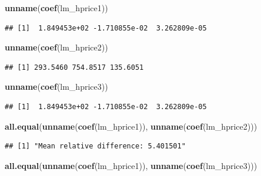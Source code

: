 \documentclass[]{book}
\newenvironment{Shaded}{\begin{snugshade}}{\end{snugshade}}
\newcommand{\KeywordTok}[1]{\textcolor[rgb]{0.13,0.29,0.53}{\textbf{#1}}}
\newcommand{\NormalTok}[1]{#1}
\begin{document}
\begin{Shaded}
\begin{Highlighting}[]
\KeywordTok{unname}\NormalTok{(}\KeywordTok{coef}\NormalTok{(lm_hprice1))}
\end{Highlighting}
\end{Shaded}

\begin{verbatim}
## [1]  1.849453e+02 -1.710855e-02  3.262809e-05
\end{verbatim}

\begin{Shaded}
\begin{Highlighting}[]
\KeywordTok{unname}\NormalTok{(}\KeywordTok{coef}\NormalTok{(lm_hprice2))}
\end{Highlighting}
\end{Shaded}

\begin{verbatim}
## [1] 293.5460 754.8517 135.6051
\end{verbatim}

\begin{Shaded}
\begin{Highlighting}[]
\KeywordTok{unname}\NormalTok{(}\KeywordTok{coef}\NormalTok{(lm_hprice3))}
\end{Highlighting}
\end{Shaded}

\begin{verbatim}
## [1]  1.849453e+02 -1.710855e-02  3.262809e-05
\end{verbatim}

\begin{Shaded}
\begin{Highlighting}[]
\KeywordTok{all.equal}\NormalTok{(}\KeywordTok{unname}\NormalTok{(}\KeywordTok{coef}\NormalTok{(lm_hprice1)), }\KeywordTok{unname}\NormalTok{(}\KeywordTok{coef}\NormalTok{(lm_hprice2)))}
\end{Highlighting}
\end{Shaded}

\begin{verbatim}
## [1] "Mean relative difference: 5.401501"
\end{verbatim}

\begin{Shaded}
\begin{Highlighting}[]
\KeywordTok{all.equal}\NormalTok{(}\KeywordTok{unname}\NormalTok{(}\KeywordTok{coef}\NormalTok{(lm_hprice1)), }\KeywordTok{unname}\NormalTok{(}\KeywordTok{coef}\NormalTok{(lm_hprice3)))}
\end{Highlighting}
\end{Shaded}
\end{document}
